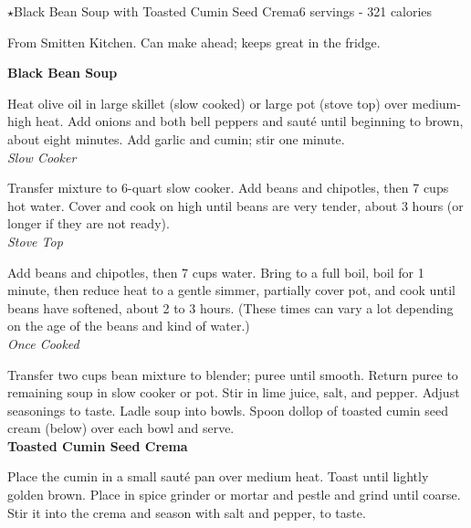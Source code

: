\begin{recipe}{\texorpdfstring{$\star$}{str}Black Bean Soup with Toasted Cumin Seed Crema}{6 servings - 321 calories}{}

\freeform From Smitten Kitchen. Can make ahead; keeps great in the fridge.


\textbf{Black Bean Soup}

Heat olive oil in large skillet (slow cooked) or large pot (stove top) over medium-high heat. Add onions and both bell peppers and sauté until beginning to brown, about eight minutes. Add garlic and cumin; stir one minute.\\

\textit{Slow Cooker}

Transfer mixture to 6-quart slow cooker. Add beans and chipotles, then 7 cups hot water. Cover and cook on high until beans are very tender, about 3 hours (or longer if they are not ready).\\

\textit{Stove Top}

Add beans and chipotles, then 7 cups water. Bring to a full boil, boil for 1 minute, then reduce heat to a gentle simmer, partially cover pot, and cook until beans have softened, about 2 to 3 hours. (These times can vary a lot depending on the age of the beans and kind of water.)\\

\textit{Once Cooked}

Transfer two cups bean mixture to blender; puree until smooth. Return puree to remaining soup in slow cooker or pot. Stir in lime juice, salt, and pepper. Adjust seasonings to taste. Ladle soup into bowls. Spoon dollop of toasted cumin seed cream (below) over each bowl and serve.\\

\textbf{Toasted Cumin Seed Crema}

Place the cumin in a small sauté pan over medium heat. Toast until lightly golden brown. Place in spice grinder or mortar and pestle and grind until coarse. Stir it into the crema and season with salt and pepper, to taste.

\end{recipe}
